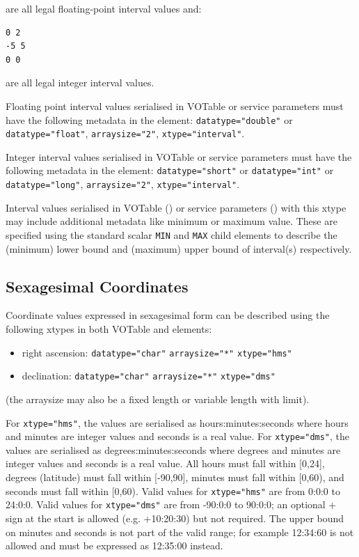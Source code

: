 \documentclass[11pt,letter]{ivoa}
\begin{document}
\noindent are all legal floating-point interval values and:

\begin{verbatim}
0 2
-5 5
0 0
\end{verbatim}

\noindent are all legal integer interval values.

Floating point interval values serialised in VOTable or service parameters must have the following metadata in the
 element: \verb|datatype="double"| or \verb|datatype="float"|,
\verb|arraysize="2"|, \verb|xtype="interval"|.

Integer interval values serialised in VOTable or service parameters must have the following metadata in the
 element: \verb|datatype="short"| or \verb|datatype="int"| or
\verb|datatype="long"|, \verb|arraysize="2"|, \verb|xtype="interval"|.

Interval values serialised in VOTable () or service parameters
() with this xtype may include additional metadata like minimum
or maximum value. These are specified using the standard scalar \verb|MIN| and
\verb|MAX| child elements to describe the (minimum) lower bound and (maximum)
upper bound of interval(s) respectively.

\subsection{Sexagesimal Coordinates}
Coordinate values expressed in sexagesimal form can be described using the following
xtypes in both VOTable  and  elements:

\begin{itemize}
\item right ascension: \verb|datatype="char"| \verb|arraysize="*"| \verb|xtype="hms"|
\item declination: \verb|datatype="char"| \verb|arraysize="*"| \verb|xtype="dms"|
\end{itemize}

\noindent
(the arraysize may also be a fixed length or variable length with limit).

For \verb|xtype="hms"|, the values are serialised as hours:minutes:seconds where hours
and minutes are integer values and seconds is a real value. For \verb|xtype="dms"|, the values
are serialised as degrees:minutes:seconds where degrees and minutes are integer
values and seconds is a real value. All hours must fall within [0,24], degrees
(latitude) must fall within [-90,90], minutes must fall within [0,60), and seconds
must fall within [0,60). Valid values for \verb|xtype="hms"| are from 0:0:0 to 24:0:0.
Valid values for \verb|xtype="dms"| are from -90:0:0 to 90:0:0; an optional + sign at
the start is allowed (e.g. +10:20:30) but not required. The upper bound on minutes 
and seconds is not part of the valid range; for example 12:34:60 is not allowed and must 
be expressed as 12:35:00 instead.
\end{document}
